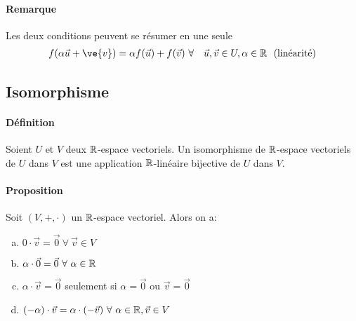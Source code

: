 \paragraph{Remarque} Les deux conditions peuvent se résumer en une seule
  \begin{eqnarray*}
    f(\alpha \vec{u} + \ve{v}) = \alpha f(\vec{u}) + f(\vec{v}) ~ &\forall&\vec{u}, \vec{v} \in U, \alpha \in \R \mbox{~ (linéarité)}
  \end{eqnarray*}

%
\subsection{Isomorphisme}
%
\paragraph{Définition} Soient $U$ et $V$ deux $\mathbb{R}$-espace vectoriels. Un isomorphisme de $\mathbb{R}$-espace vectoriels de $U$ dans $V$ est une application $\mathbb{R}$-linéaire bijective de $U$ dans $V$. %

\paragraph{Proposition} Soit $(V, +, \cdot)$ un $\mathbb{R}$-espace vectoriel. Alors on a:
\begin{enumerate}[a)]
  \item $0\cdot \vec{v} = \vec{0} ~\forall~ \vec{v} \in V$
  \item $\alpha \cdot \vec{0} = \vec{0} ~\forall~ \alpha \in \mathbb{R}$
  \item $\alpha \cdot \vec{v} = \vec{0}$ seulement si $\alpha = \vec{0}$ ou $\vec{v} = \vec{0}$
  \item $(-\alpha)\cdot \vec{v} = \alpha \cdot (-\vec{v}) ~\forall~ \alpha \in \mathbb{R}, \vec{v} \in V$
\end{enumerate}


